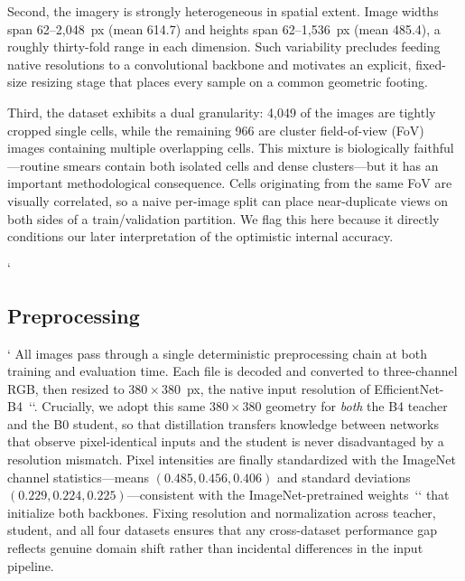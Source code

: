 \documentclass[twocolumn]{article}
\begin{document}
Second, the imagery is strongly heterogeneous in spatial extent. Image widths span 62--2{,}048~px (mean 614.7) and heights span 62--1{,}536~px (mean 485.4), a roughly thirty-fold range in each dimension. Such variability precludes feeding native resolutions to a convolutional backbone and motivates an explicit, fixed-size resizing stage that places every sample on a common geometric footing.

Third, the dataset exhibits a dual granularity: 4{,}049 of the images are tightly cropped single cells, while the remaining 966 are cluster field-of-view (FoV) images containing multiple overlapping cells. This mixture is biologically faithful---routine smears contain both isolated cells and dense clusters---but it has an important methodological consequence. Cells originating from the same FoV are visually correlated, so a naive per-image split can place near-duplicate views on both sides of a train/validation partition. We flag this here because it directly conditions our later interpretation of the optimistic internal accuracy.

`\subsection{Preprocessing}`
All images pass through a single deterministic preprocessing chain at both training and evaluation time. Each file is decoded and converted to three-channel RGB, then resized to $380\times380$~px, the native input resolution of EfficientNet-B4~`\citep{tan2019efficientnet}`. Crucially, we adopt this same $380\times380$ geometry for \emph{both} the B4 teacher and the B0 student, so that distillation transfers knowledge between networks that observe pixel-identical inputs and the student is never disadvantaged by a resolution mismatch. Pixel intensities are finally standardized with the ImageNet channel statistics---means $(0.485, 0.456, 0.406)$ and standard deviations $(0.229, 0.224, 0.225)$---consistent with the ImageNet-pretrained weights~`\citep{deng2009imagenet}` that initialize both backbones. Fixing resolution and normalization across teacher, student, and all four datasets ensures that any cross-dataset performance gap reflects genuine domain shift rather than incidental differences in the input pipeline.
\end{document}

